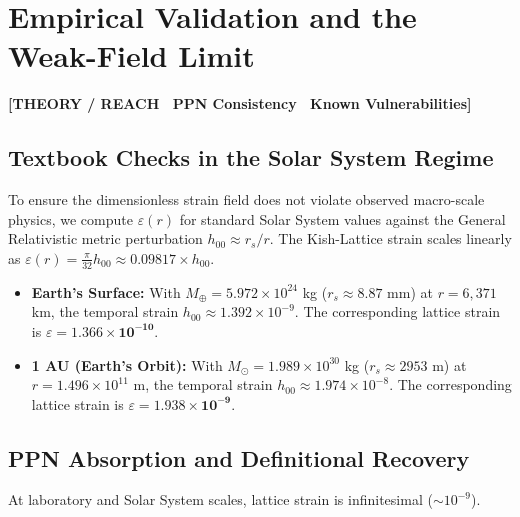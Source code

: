 \documentclass[11pt, letterpaper, openany]{book}
\begin{document}
\chapter{Empirical Validation and the Weak-Field Limit}

\begin{center}
{\color{theorytag}\textbf{[THEORY / REACH \textbullet\ PPN Consistency \textbullet\ Known Vulnerabilities]}}
\end{center}

\section{Textbook Checks in the Solar System Regime}

To ensure the dimensionless strain field does not violate observed macro-scale physics, we compute $\varepsilon(r)$ for standard Solar System values against the General Relativistic metric perturbation $h_{00} \approx r_s/r$. The Kish-Lattice strain scales linearly as $\varepsilon(r) = \frac{\pi}{32} h_{00} \approx 0.09817 \times h_{00}$.

\begin{itemize}
    \item \textbf{Earth's Surface:} With $M_{\oplus} = 5.972 \times 10^{24}$ kg ($r_s \approx 8.87$ mm) at $r = 6,371$ km, the temporal strain $h_{00} \approx 1.392 \times 10^{-9}$. The corresponding lattice strain is $\varepsilon = \mathbf{1.366 \times 10^{-10}}$.
    \item \textbf{1 AU (Earth's Orbit):} With $M_{\odot} = 1.989 \times 10^{30}$ kg ($r_s \approx 2953$ m) at $r = 1.496 \times 10^{11}$ m, the temporal strain $h_{00} \approx 1.974 \times 10^{-8}$. The corresponding lattice strain is $\varepsilon = \mathbf{1.938 \times 10^{-9}}$.
\end{itemize}

\section{PPN Absorption and Definitional Recovery}
\label{sec:ppn}

At laboratory and Solar System scales, lattice strain is infinitesimal ($\sim 10^{-9}$).
\end{document}
